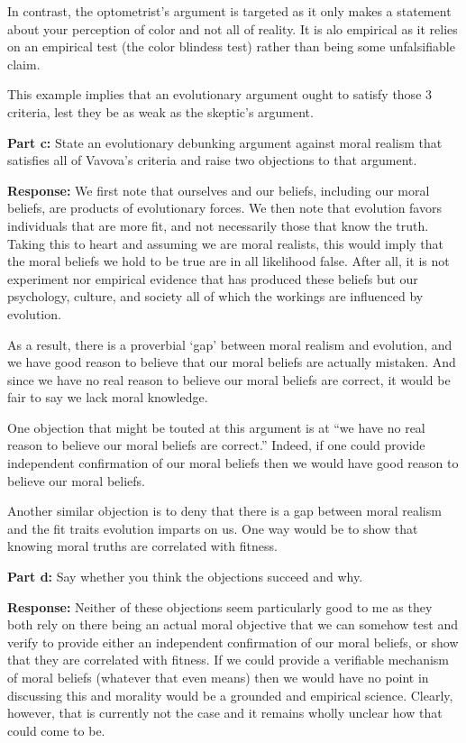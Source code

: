 \documentclass{article}
\begin{document}
In contrast, the optometrist's argument is targeted as it only makes a statement about your perception of color and not all of reality. It is alo empirical as it relies on an empirical test (the color blindess test) rather than being some unfalsifiable claim.

This example implies that an evolutionary argument ought to satisfy those 3 criteria, lest they be as weak as the skeptic's argument.

\bigskip

\noindent\textbf{Part c:} State an evolutionary debunking argument against moral realism that satisfies all of Vavova’s criteria and raise two objections to that argument.
\bigskip

\noindent\textbf{Response:} We first note that ourselves and our beliefs, including our moral beliefs, are products of evolutionary forces. We then note that evolution favors individuals that are more fit, and not necessarily those that know the truth. Taking this to heart and assuming we are moral realists, this would imply that the moral beliefs we hold to be true are in all likelihood false. After all, it is not experiment nor empirical evidence that has produced these beliefs but our psychology, culture, and society all of which the workings are influenced by evolution.

As a result, there is a proverbial `gap' between moral realism and evolution, and we have good reason to believe that our moral beliefs are actually mistaken. And since we have no real reason to believe our moral beliefs are correct, it would be fair to say we lack moral knowledge.

One objection that might be touted at this argument is at ``we have no real reason to believe our moral beliefs are correct.'' Indeed, if one could provide independent confirmation of our moral beliefs then we would have good reason to believe our moral beliefs.

Another similar objection is to deny that there is a gap between moral realism and the fit traits evolution imparts on us. One way would be to show that knowing moral truths are correlated with fitness.
\bigskip

\noindent\textbf{Part d:} Say whether you think the objections succeed and why.
\bigskip

\noindent\textbf{Response:} Neither of these objections seem particularly good to me as they both rely on there being an actual moral objective that we can somehow test and verify to provide either an independent confirmation of our moral beliefs, or show that they are correlated with fitness. If we could provide a verifiable mechanism of moral beliefs (whatever that even means) then we would have no point in discussing this and morality would be a grounded and empirical science. Clearly, however, that is currently not the case and it remains wholly unclear how that could come to be.
\end{document}
